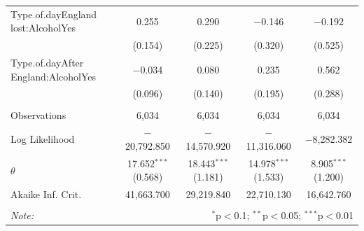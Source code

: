 \documentclass[12pt, letterpaper]{article}
\begin{document}
\begin{table}
{\begin{tabular}{@{\extracolsep{5pt}}lcccc}
  Type.of.dayEngland lost:AlcoholYes & 0.255 & 0.290 & $-$0.146 & $-$0.192 \\ 
  & (0.154) & (0.225) & (0.320) & (0.525) \\ 
  Type.of.dayAfter England:AlcoholYes & $-$0.034 & 0.080 & 0.235 & 0.562 \\ 
  & (0.096) & (0.140) & (0.195) & (0.288) \\ 
 \hline \\[-1.8ex] 
Observations & 6,034 & 6,034 & 6,034 & 6,034 \\ 
Log Likelihood & $-$20,792.850 & $-$14,570.920 & $-$11,316.060 & $-$8,282.382 \\ 
$\theta$ & 17.652$^{***}$  (0.568) & 18.443$^{***}$  (1.181) & 14.978$^{***}$  (1.533) & 8.905$^{***}$  (1.200) \\ 
Akaike Inf. Crit. & 41,663.700 & 29,219.840 & 22,710.130 & 16,642.760 \\ 
\hline 
\hline \\[-1.8ex] 
\textit{Note:}  & \multicolumn{4}{r}{$^{*}$p$<$0.1; $^{**}$p$<$0.05; $^{***}$p$<$0.01} \\ 
\end{tabular} }
\end{table}

\newpage
\end{document}
